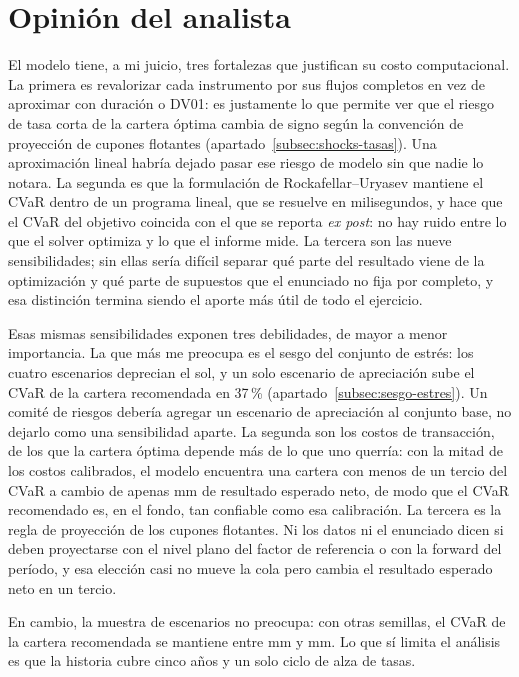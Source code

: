 \section{Opinión del analista}\label{sec:opinion}

El modelo tiene, a mi juicio, tres fortalezas que justifican su costo computacional. La primera es
revalorizar cada instrumento por sus flujos completos en vez de aproximar con duración o DV01: es justamente
lo que permite ver que el riesgo de tasa corta de la cartera óptima cambia de signo según la convención de
proyección de cupones flotantes (apartado~\ref{subsec:shocks-tasas}). Una aproximación lineal habría dejado
pasar ese riesgo de modelo sin que nadie lo notara. La segunda es que la formulación de
Rockafellar--Uryasev mantiene el CVaR dentro de un programa lineal, que se resuelve en milisegundos, y hace
que el CVaR del objetivo coincida con el que se reporta \emph{ex post}: no hay ruido entre lo que el solver
optimiza y lo que el informe mide. La tercera son las nueve sensibilidades; sin ellas sería difícil separar
qué parte del resultado viene de la optimización y qué parte de supuestos que el enunciado no fija por
completo, y esa distinción termina siendo el aporte más útil de todo el ejercicio.

Esas mismas sensibilidades exponen tres debilidades, de mayor a menor importancia. La que más me preocupa
es el sesgo del conjunto de estrés: los cuatro escenarios deprecian el sol, y un solo escenario de
apreciación sube el CVaR de la cartera recomendada en 37\,\% (apartado~\ref{subsec:sesgo-estres}). Un
comité de riesgos debería agregar un escenario de apreciación al conjunto base, no dejarlo como una
sensibilidad aparte. La segunda son los costos de transacción, de los que la cartera óptima depende más de
lo que uno querría: con la mitad de los costos calibrados, el modelo encuentra una cartera con menos de un
tercio del CVaR a cambio de apenas  mm de resultado esperado neto, de modo que el CVaR recomendado es, en el fondo, tan confiable como esa
calibración. La tercera es la regla de proyección de los cupones flotantes. Ni los datos ni el enunciado
dicen si deben proyectarse con el nivel plano del factor de referencia o con la forward del período, y esa
elección casi no mueve la cola pero cambia el resultado esperado neto en un tercio.

En cambio, la muestra de escenarios no preocupa: con otras semillas, el CVaR de la cartera recomendada se
mantiene entre  mm y  mm. Lo que sí limita el análisis es que la historia cubre cinco años y
un solo ciclo de alza de tasas.

